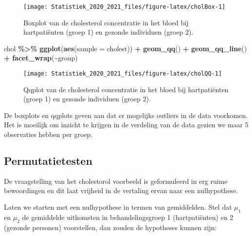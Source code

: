 \documentclass[
  12pt,dutch,coursenotes]{book}
\newenvironment{Shaded}{\begin{snugshade}}{\end{snugshade}}
\newcommand{\DataTypeTok}[1]{\textcolor[rgb]{0.13,0.29,0.53}{#1}}
\newcommand{\KeywordTok}[1]{\textcolor[rgb]{0.13,0.29,0.53}{\textbf{#1}}}
\newcommand{\NormalTok}[1]{#1}
\newcommand{\OperatorTok}[1]{\textcolor[rgb]{0.81,0.36,0.00}{\textbf{#1}}}
\newcommand{\StringTok}[1]{\textcolor[rgb]{0.31,0.60,0.02}{#1}}
\theoremstyle{definition}
\theoremstyle{definition}
\theoremstyle{definition}
\theoremstyle{remark}
\begin{document}
\begin{figure}

{\centering \texttt{[image: Statistiek\_2020\_2021\_files/figure-latex/cholBox-1]} 

}

\caption{Boxplot van de cholesterol concentratie in het bloed bij hartpatiënten (groep 1) en gezonde individuen (groep 2).}\label{fig:cholBox}
\end{figure}

\begin{Shaded}
\begin{Highlighting}[]
\NormalTok{chol }\OperatorTok{\%\textgreater{}\%}\StringTok{ }\KeywordTok{ggplot}\NormalTok{(}\KeywordTok{aes}\NormalTok{(}\DataTypeTok{sample =}\NormalTok{ cholest)) }\OperatorTok{+}\StringTok{ }\KeywordTok{geom\_qq}\NormalTok{() }\OperatorTok{+}\StringTok{ }
\StringTok{    }\KeywordTok{geom\_qq\_line}\NormalTok{() }\OperatorTok{+}\StringTok{ }\KeywordTok{facet\_wrap}\NormalTok{(}\OperatorTok{\textasciitilde{}}\NormalTok{group)}
\end{Highlighting}
\end{Shaded}

\begin{figure}

{\centering \texttt{[image: Statistiek\_2020\_2021\_files/figure-latex/cholQQ-1]} 

}

\caption{Qqplot van de cholesterol concentratie in het bloed bij hartpatiënten (groep 1) en gezonde individuen (groep 2).}\label{fig:cholQQ}
\end{figure}

De boxplots en qqplots geven aan dat er mogelijks outliers in de data voorkomen.
Het is moeilijk om inzicht te krijgen in de verdeling van de data gezien we maar 5 observaties hebben per groep.

\hypertarget{permutatietesten}{%
\subsection{Permutatietesten}\label{permutatietesten}}

De vraagstelling van het cholestorol voorbeeld is geformuleerd in erg ruime bewoordingen en dit laat vrijheid in de vertaling ervan naar een nulhypothese.

Laten we starten met een nulhypothese in termen van gemiddelden. Stel dat \(\mu_1\) en \(\mu_2\) de gemiddelde uitkomsten in behandelingsgroep 1 (hartpatiënten) en 2 (gezonde personen) voorstellen, dan zouden de hypotheses kunnen zijn:
\end{document}
